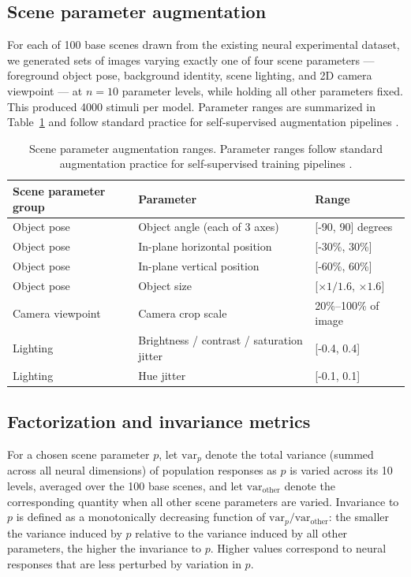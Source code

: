 \documentclass[11pt]{article}
\begin{document}
\subsection{Scene parameter augmentation}

For each of 100 base scenes drawn from the existing neural experimental
dataset, we generated sets of images varying exactly one of four scene
parameters --- foreground object pose, background identity, scene lighting,
and 2D camera viewpoint --- at \(n=10\) parameter levels, while holding all
other parameters fixed. This produced 4000 stimuli per model. Parameter
ranges are summarized in Table~\ref{tab:augparams} and follow standard
practice for self-supervised augmentation pipelines
\citep{chen2020simple, he2020momentum}.

\begin{table}[htbp]
\centering
\caption{Scene parameter augmentation ranges. Parameter ranges follow
standard augmentation practice for self-supervised training pipelines
\citep{chen2020simple, he2020momentum}.}
\label{tab:augparams}
\begin{tabular}{lll}
\toprule
Scene parameter group & Parameter & Range \\
\midrule
Object pose & Object angle (each of 3 axes) & [-90, 90] degrees \\
Object pose & In-plane horizontal position & [-30\%, 30\%] \\
Object pose & In-plane vertical position & [-60\%, 60\%] \\
Object pose & Object size & [$\times 1/1.6$, $\times 1.6$] \\
Camera viewpoint & Camera crop scale & 20\%--100\% of image \\
Lighting & Brightness / contrast / saturation jitter & [-0.4, 0.4] \\
Lighting & Hue jitter & [-0.1, 0.1] \\
\bottomrule
\end{tabular}
\end{table}

\subsection{Factorization and invariance metrics}

For a chosen scene parameter \(p\), let \(\mathrm{var}_{p}\) denote the
total variance (summed across all neural dimensions) of population responses
as \(p\) is varied across its 10 levels, averaged over the 100 base scenes,
and let \(\mathrm{var}_{\mathrm{other}}\) denote the corresponding quantity
when all other scene parameters are varied. Invariance to \(p\) is defined
as a monotonically decreasing function of
\(\mathrm{var}_{p}/\mathrm{var}_{\mathrm{other}}\): the smaller the variance
induced by \(p\) relative to the variance induced by all other parameters,
the higher the invariance to \(p\). Higher values correspond to neural
responses that are less perturbed by variation in \(p\).
\end{document}
